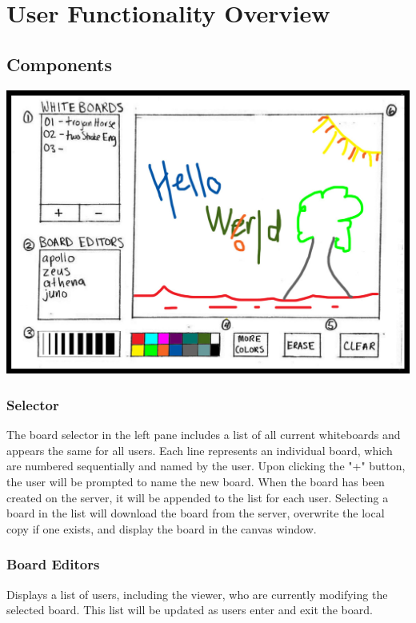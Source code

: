 \section{User Functionality Overview}

\subsection{Components}

\includegraphics[keepaspectratio=1,width=6in]{img/gui-sketch.jpg}

\subsubsection{Selector}

The board selector in the left pane includes a list of all current whiteboards and appears the same for all users. Each line represents an individual board, which are numbered sequentially and named by the user. Upon clicking the "+" button, the user will be prompted to name the new board. When the board has been created on the server, it will be appended to the list for each user. Selecting a board in the list will download the board from the server, overwrite the local copy if one exists, and display the board in the canvas window. 

\subsubsection{Board Editors}

Displays a list of users, including the viewer, who are currently modifying the selected board. This list will be updated as users enter and exit the board.

